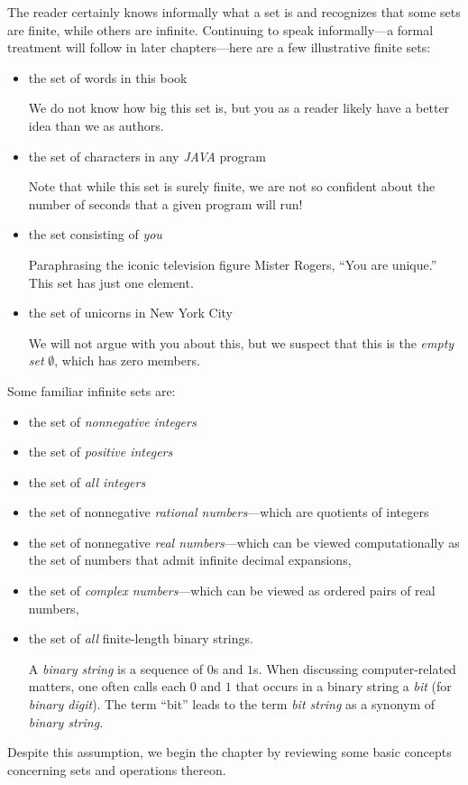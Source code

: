 The reader certainly knows informally what a set is and recognizes
that some sets are finite, while others are infinite.  Continuing to
speak informally---a formal treatment will follow in later
chapters---here are a few illustrative finite sets:
\begin{itemize}
\item
the set of words in this book

We do not know how big this set is, but you as a reader likely have a
better idea than we as authors.
\item
the set of characters in any {\it JAVA} program

Note that while this set is surely finite, we are not so confident
about the number of seconds that a given program will run!
\item
the set consisting of {\em you}

Paraphrasing the iconic television figure Mister Rogers, ``You are
unique.''  This set has just one element.

\item
the set of unicorns in New York City

We will not argue with you about this, but we suspect that this is the
{\em empty set} $\emptyset$, which has zero members.
\end{itemize}
Some familiar infinite sets are:
\begin{itemize}
\item
the set of {\em nonnegative integers}
\item
the set of {\em positive integers}
\item
the set of {\em all integers}
\item
the set of nonnegative {\em rational numbers}---which are quotients of
integers
\item
the set of nonnegative {\em real numbers}---which can be viewed
computationally as the set of numbers that admit infinite decimal
expansions,
\item
the set of {\em complex numbers}---which can be viewed as ordered
pairs of real numbers,
\item
the set of {\em all} finite-length binary strings.

A {\it binary string} is a sequence of $0$s and
$1$s.  When discussing computer-related matters, one often calls each
$0$ and $1$ that occurs in a binary string a {\it bit}
 (for {\it binary digit}).  The term ``bit''
leads to the term {\it bit string}  as a synonym of
{\it binary string}.
\end{itemize}
Despite this assumption, we begin the chapter by reviewing some basic
concepts concerning sets and operations thereon.

